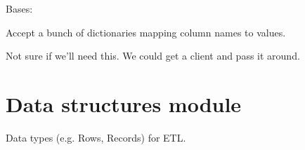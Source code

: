 \documentclass[letterpaper,10pt,english]{sphinxmanual}
\begin{document}
\begin{fulllineitems}
\label{\detokenize{api:nanostream.civis_nodes.SendToCivis}}
Bases: {\hyperref[\detokenize{api:nanostream.node.NanoNode}]{}}

\begin{fulllineitems}
\label{\detokenize{api:nanostream.civis_nodes.SendToCivis.monitor_futures}}
\end{fulllineitems}


\begin{fulllineitems}
\label{\detokenize{api:nanostream.civis_nodes.SendToCivis.process_item}}
Accept a bunch of dictionaries mapping column names to values.

\end{fulllineitems}


\begin{fulllineitems}
\label{\detokenize{api:nanostream.civis_nodes.SendToCivis.setup}}
Not sure if we’ll need this. We could get a client and pass it around.

\end{fulllineitems}


\end{fulllineitems}

\label{\detokenize{api:module-nanostream.utils.data_structures}}

\section{Data structures module}
\label{\detokenize{api:data-structures-module}}
Data types (e.g. Rows, Records) for ETL.
\end{document}

